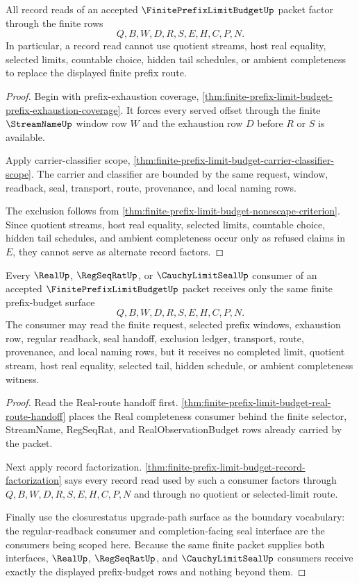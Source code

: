 \begin{theorem}
\label{thm:finite-prefix-limit-budget-record-factorization}
All record reads of an accepted $\FinitePrefixLimitBudgetUp$ packet factor through the finite rows
$$
Q,B,W,D,R,S,E,H,C,P,N.
$$
In particular, a record read cannot use quotient streams, host real equality, selected limits, countable choice, hidden tail schedules, or ambient completeness to replace the displayed finite prefix route.
\end{theorem}
\begin{proof}
Begin with prefix-exhaustion coverage, \autoref{thm:finite-prefix-limit-budget-prefix-exhaustion-coverage}. It forces every served offset through the finite $\StreamNameUp$ window row $W$ and the exhaustion row $D$ before $R$ or $S$ is available.

Apply carrier-classifier scope, \autoref{thm:finite-prefix-limit-budget-carrier-classifier-scope}. The carrier and classifier are bounded by the same request, window, readback, seal, transport, route, provenance, and local naming rows.

The exclusion follows from \autoref{thm:finite-prefix-limit-budget-nonescape-criterion}. Since quotient streams, host real equality, selected limits, countable choice, hidden tail schedules, and ambient completeness occur only as refused claims in $E$, they cannot serve as alternate record factors.
\end{proof}

\begin{theorem}
\label{thm:finite-prefix-limit-budget-consumer-boundary}
Every $\RealUp$, $\RegSeqRatUp$, or $\CauchyLimitSealUp$ consumer of an accepted $\FinitePrefixLimitBudgetUp$ packet receives only the same finite prefix-budget surface
$$
Q,B,W,D,R,S,E,H,C,P,N.
$$
The consumer may read the finite request, selected prefix windows, exhaustion row, regular readback, seal handoff, exclusion ledger, transport, route, provenance, and local naming rows, but it receives no completed limit, quotient stream, host real equality, selected tail, hidden schedule, or ambient completeness witness.
\end{theorem}
\begin{proof}
Read the Real-route handoff first. \autoref{thm:finite-prefix-limit-budget-real-route-handoff} places the Real completeness consumer behind the finite selector, StreamName, RegSeqRat, and RealObservationBudget rows already carried by the packet.

Next apply record factorization. \autoref{thm:finite-prefix-limit-budget-record-factorization} says every record read used by such a consumer factors through $Q,B,W,D,R,S,E,H,C,P,N$ and through no quotient or selected-limit route.

Finally use the closurestatus upgrade-path surface as the boundary vocabulary: the regular-readback consumer and completion-facing seal interface are the consumers being scoped here. Because the same finite packet supplies both interfaces, $\RealUp$, $\RegSeqRatUp$, and $\CauchyLimitSealUp$ consumers receive exactly the displayed prefix-budget rows and nothing beyond them.
\end{proof}

